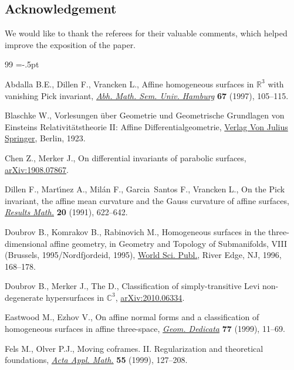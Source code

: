 \documentclass[10pt,a4paper]{amsart}
\numberwithin{equation}{section}
\begin{document}
\subsection*{Acknowledgement}

We would like to thank the referees for their valuable comments, which helped improve the exposition of the paper.


\begin{thebibliography}{99}
\footnotesize\itemsep=-.5pt

Abdalla B.E., Dillen F., Vrancken L., Affine homogeneous surfaces in {${\mathbb
 R}^3$} with vanishing {P}ick invariant, \href{https://doi.org/10.1007/BF02940821}{\textit{Abh. Math. Sem. Univ.
 Hamburg}} \textbf{67} (1997), 105--115.

Blaschke W., Vorlesungen \"uber {G}eometrie und {G}eometrische {G}rundlagen von
 {E}insteins {R}elativit\"atstheorie {II}: {A}ffine {D}ifferentialgeometrie,
 \href{https://doi.org/10.1007/978-3-642-47392-0}{Verlag Von Julius Springer}, Berlin, 1923.

Chen Z., Merker J., On differential invariants of parabolic surfaces,
 \href{https://arxiv.org/abs/1908.07867}{arXiv:1908.07867}.

Dillen F., Mart\'{\i}nez A., Mil\'an F., Garcia~Santos F., Vrancken L., On the
 {P}ick invariant, the affine mean curvature and the {G}auss curvature of
 affine surfaces, \href{https://doi.org/10.1007/BF03323199}{\textit{Results Math.}} \textbf{20} (1991), 622--642.

Doubrov B., Komrakov B., Rabinovich M., Homogeneous surfaces in the
 three-dimensional affine geometry, in Geometry and Topology of Submanifolds,
 {VIII} ({B}russels, 1995/{N}ordfjordeid, 1995), \href{https://doi.org/10.1142/9789814530873}{World Sci. Publ.}, River Edge,
 NJ, 1996, 168--178.

Doubrov B., Merker J., The D., Classification of simply-transitive Levi
 non-degenerate hypersurfaces in $\mathbb{C}^3$, \href{https://arxiv.org/abs/2010.06334}{arXiv:2010.06334}.

Eastwood M., Ezhov V., On affine normal forms and a classification of
 homogeneous surfaces in affine three-space, \href{https://doi.org/10.1023/A:1005083518793}{\textit{Geom. Dedicata}}
 \textbf{77} (1999), 11--69.

Fels M., Olver P.J., Moving coframes. {II}. {R}egularization and theoretical
 foundations, \href{https://doi.org/10.1023/A:1006195823000}{\textit{Acta Appl. Math.}} \textbf{55} (1999), 127--208.


\end{thebibliography}
\end{document}

